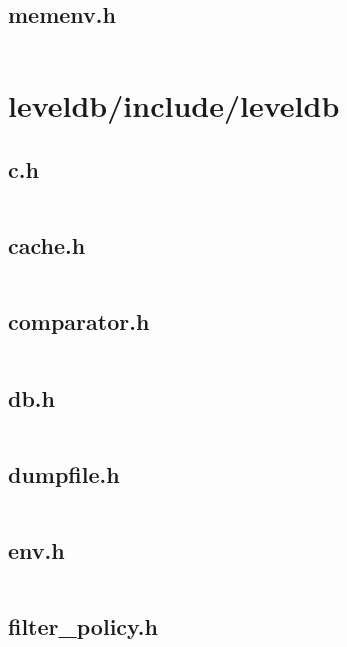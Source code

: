\documentclass{article}
\begin{document}
\subsection{memenv.h}
\inputminted{cpp}{/home/dufferzafar/dev/@clones/bitcoin/src/leveldb/helpers/memenv/memenv.h}
\newpage

\section{leveldb/include/leveldb}

\subsection{c.h}
\inputminted{cpp}{/home/dufferzafar/dev/@clones/bitcoin/src/leveldb/include/leveldb/c.h}
\newpage

\subsection{cache.h}
\inputminted{cpp}{/home/dufferzafar/dev/@clones/bitcoin/src/leveldb/include/leveldb/cache.h}
\newpage

\subsection{comparator.h}
\inputminted{cpp}{/home/dufferzafar/dev/@clones/bitcoin/src/leveldb/include/leveldb/comparator.h}
\newpage

\subsection{db.h}
\inputminted{cpp}{/home/dufferzafar/dev/@clones/bitcoin/src/leveldb/include/leveldb/db.h}
\newpage

\subsection{dumpfile.h}
\inputminted{cpp}{/home/dufferzafar/dev/@clones/bitcoin/src/leveldb/include/leveldb/dumpfile.h}
\newpage

\subsection{env.h}
\inputminted{cpp}{/home/dufferzafar/dev/@clones/bitcoin/src/leveldb/include/leveldb/env.h}
\newpage

\subsection{filter\_policy.h}
\inputminted{cpp}{/home/dufferzafar/dev/@clones/bitcoin/src/leveldb/include/leveldb/filter_policy.h}
\newpage
\end{document}
